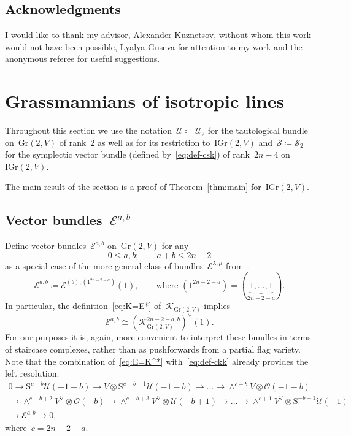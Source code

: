 \documentclass[a4paper]{article}
\newcommand{\Gr}{\mathrm{Gr}}
\newcommand{\IGr}{\mathrm{IGr}}
\newcommand{\cE}{\mathcal{E}}
\newcommand{\cK}{\mathcal{K}}
\newcommand{\cU}{\mathcal{U}}
\newcommand{\cS}{\mathcal{S}}
\newcommand{\cO}{\mathcal{O}}
\theoremstyle{remark}
\theoremstyle{definition}
\begin{document}
\subsection*{Acknowledgments} I would like to thank my advisor, Alexander Kuznetsov, without whom this work would not have been possible, Lyalya Guseva for attention to my work and the anonymous referee for useful suggestions.



\section{Grassmannians of isotropic lines}
\label{sec:case_k=2}


Throughout this section we use the notation~\(\cU \coloneqq \cU_2\) 
for the tautological bundle on~\(\Gr(2,V)\) of rank~2 as well as for its restriction to~\(\IGr(2,V)\)
and~\(\cS \coloneqq \cS_2\) for the symplectic vector bundle (defined by~\eqref{eq:def-csk}) of rank~\(2n - 4\) on~\(\IGr(2,V)\).

The main result of the section is a proof of Theorem~\ref{thm:main} for~\(\IGr(2,V)\).

\subsection{Vector bundles~\texorpdfstring{\(\cE^{a,b}\)}{E{a,b}}}

Define vector bundles~\(\cE^{a,b}\) on~\(\Gr(2,V)\) for any
\begin{equation}
	\label{eq:ab-condition}
	0 \le a,b; \qquad a + b \le 2n - 2
\end{equation}
as a special case of the more general class of bundles~\(\cE^{\lambda,\mu}\) from~\cite{F15}:
\begin{equation}
	\cE^{a,b} \coloneqq \cE^{(b),(1^{2n-2-a})}(1), \qquad \text{where~\((1^{2n-2-a}) = (\underbrace{1, \dots, 1}_{2n-2-a})\).}
\end{equation}
In particular, the definition~\eqref{eq:K=E*} of~\(\cK_{\Gr(2,V)}\) implies
\begin{equation}
	\label{eq:E=K^*}
	\cE^{a,b} \cong \left(\cK_{\Gr(2,V)}^{2n-2-a,b}\right)^\vee(1).
\end{equation}
For our purposes it is, again, more convenient to interpret these bundles in terms of staircase complexes, 
rather than as pushforwards from a partial flag variety. Note that the combination of~\eqref{eq:E=K^*} with~\eqref{eq:def-ckk} already provides the left resolution:
\begin{multline}
	\label{eq:E-left_res}
	0 \to
	\mathrm{S}^{c-b}\cU(-1-b) \to 
	V \otimes \mathrm{S}^{c-b-1}\cU(-1-b) \to 
	\dots \to
	\wedge^{c-b}V \otimes \cO(-1-b)
	\\ \to 
	\wedge^{c-b+2}V^\vee \otimes \cO(-b) \to 
	\wedge^{c-b+3}V^\vee \otimes \cU(-b+1) \to 
	\dots \to
	\wedge^{c+1}V^\vee \otimes \mathrm{S}^{-b+1}\cU(-1) \\
	\to \cE^{a,b} \to
	0,
\end{multline}
where~\(c=2n-2-a\).
\end{document}
